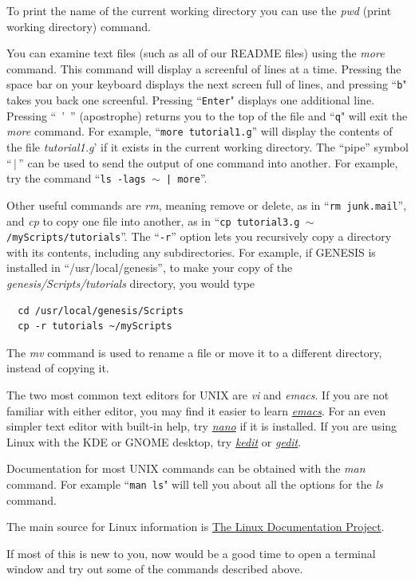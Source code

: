\documentclass[12pt]{article}
\begin{document}
To print the name of the current working directory you can use the {\it pwd} (print working directory) command.

You can examine text files (such as all of our README files) using the {\it more} command. This command will display a screenful of lines at a time. Pressing the space bar on your keyboard displays the next screen full of lines, and pressing ``{\tt b}" takes you back one screenful. Pressing ``{\tt Enter}" displays one additional line. Pressing ``\ '\ '' (apostrophe) returns you to the top of the file and ``{\tt q}" will exit the {\it more} command. For example, ``{\tt more tutorial1.g}'' will display the contents of the file {\it tutorial1.g}' if it exists in the current working directory. The ``pipe'' symbol ``\,$|$\,'' can be used to send the output of one command into another. For example, try the command ``{\tt ls -lags $\sim$ | more}''.

Other useful commands are {\it rm}, meaning remove or delete, as in ``{\tt rm junk.mail}'', and {\it cp} to copy one file into another, as in ``{\tt cp tutorial3.g $\sim$/myScripts/tutorials}''. The ``{\tt -r}'' option lets you recursively copy a directory with its contents, including any subdirectories. For example, if GENESIS is installed in ``/usr/local/genesis'', to make your copy of the {\it genesis/Scripts/tutorials} directory, you would type
\begin{verbatim}
  cd /usr/local/genesis/Scripts
  cp -r tutorials ~/myScripts
 \end{verbatim}
The {\it mv} command is used to rename a file or move it to a different directory, instead of copying it.

The two most common text editors for UNIX are {\it vi} and {\it emacs}. If you are not familiar with either editor, you may find it easier to learn \href{http://www.gnu.org/software/emacs/tour/}{\it emacs}. For an even simpler text editor with built-in help, try \href{http://www.nano-editor.org/}{\it nano} if it is installed. If you are using Linux with the KDE or GNOME desktop, try \href{http://linuxappfinder.com/package/kedit}{\it kedit} or \href{http://projects.gnome.org/gedit/}{\it gedit}.

Documentation for most UNIX commands can be obtained with the {\it man} command. For example ``{\tt man ls}" will tell you about all the options for the {\it ls} command.

The main source for Linux information is \href{http://www.tldp.org/ }{The Linux Documentation Project}.

If most of this is new to you, now would be a good time to open a terminal window and try out some of the commands described above.
\end{document}
